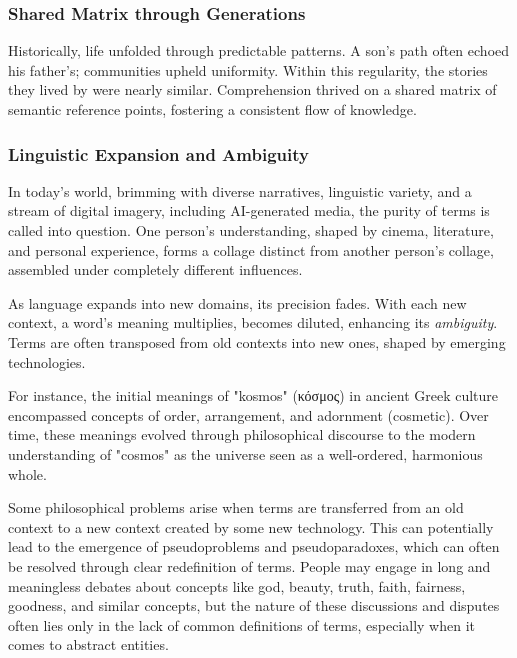\documentclass[11pt,a4]{article}
\newcommand{\textgreek}[1]{\begingroup\fontencoding{LGR}\selectfont#1\endgroup}
\begin{document}
        \subsubsection{Shared Matrix through Generations}
            \par
            Historically, life unfolded through predictable patterns. A son's path often echoed his father's;
            communities upheld uniformity. Within this regularity, the stories they lived by were nearly similar.
            Comprehension thrived on a shared matrix of semantic reference points, fostering a consistent flow of knowledge.

        \subsubsection{Linguistic Expansion and Ambiguity}

            In today's world, brimming with diverse narratives, linguistic variety, and a stream of digital imagery,
            including AI-generated media, the purity of terms is called into question. One person's understanding,
            shaped by cinema, literature, and personal experience, forms a collage distinct from another
            person's collage, assembled under completely different influences.

            As language expands into new domains, its precision fades. With each new context, a word's meaning
            multiplies, becomes diluted, enhancing its \textit{ambiguity}. Terms are often transposed from old
            contexts into new ones, shaped by emerging technologies.

            For instance,  the initial meanings of "kosmos" (\textgreek{κόσμος}) in ancient Greek culture
            encompassed concepts of order, arrangement, and adornment (cosmetic). Over time, these meanings
            evolved through philosophical discourse to the modern understanding of "cosmos" as the universe seen as a well-ordered, harmonious whole.


             Some philosophical problems arise when terms are transferred from an old context to a new context created by some new technology. This can potentially lead to the emergence of pseudoproblems and pseudoparadoxes, which can often be resolved through clear redefinition of terms. People may engage in long and meaningless debates about concepts like god, beauty, truth, faith, fairness, goodness, and similar concepts, but the nature of these discussions and disputes often lies only in the lack of common definitions of terms, especially when it comes to abstract entities.
\end{document}
